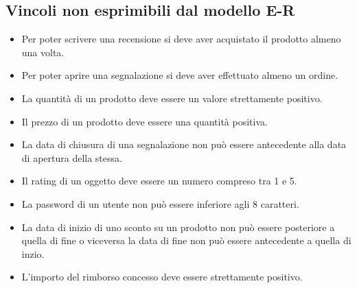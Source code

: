 \subsection{Vincoli non esprimibili dal modello E-R}

\begin{itemize}
    \item Per poter scrivere una recensione si deve aver acquistato il prodotto almeno una volta. 
    \item Per poter aprire una segnalazione si deve aver effettuato almeno un ordine.
    \item La quantità di un prodotto deve essere un valore strettamente positivo.
    \item Il prezzo di un prodotto deve essere una quantità positiva.
    \item La data di chiusura di una segnalazione non può essere antecedente alla data di apertura della stessa.
    \item Il rating di un oggetto deve essere un numero compreso tra 1 e 5.
    \item La password di un utente non può essere inferiore agli 8 caratteri.
    \item La data di inizio di uno sconto su un prodotto non può essere posteriore a quella di fine o viceversa la data di fine non può essere antecedente a quella di inzio.
    \item L'importo del rimborso concesso deve essere strettamente positivo.
\end{itemize}
